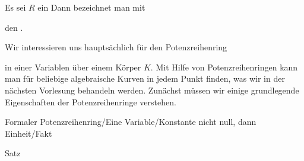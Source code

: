 
{}

{


Es sei $R$ ein
Dann bezeichnet man mit


 {  }


den 
 {} {.}


}
Wir interessieren uns hauptsächlich für den Potenzreihenring

 in einer Variablen über einem Körper $K$. Mit Hilfe von Potenzreihenringen kann man  für beliebige algebraische Kurven in jedem Punkt finden, was wir in der nächsten Vorlesung behandeln werden. Zunächst müssen wir einige grundlegende Eigenschaften der Potenzreihenringe verstehen.



{Formaler Potenzreihenring/Eine Variable/Konstante nicht null, dann Einheit/Fakt}

{Satz}

{}

{


\faktsituation {}



\faktzusatz {}

\faktzusatz {}


}

